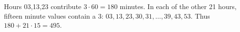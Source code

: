 Hours 03,13,23 contribute $3\cdot60=180$ minutes. In each of the other 21 hours, fifteen minute values contain a 3: $03,13,23,30,31,\ldots,39,43,53$. Thus $180+21\cdot15=\boxed{495}$.
